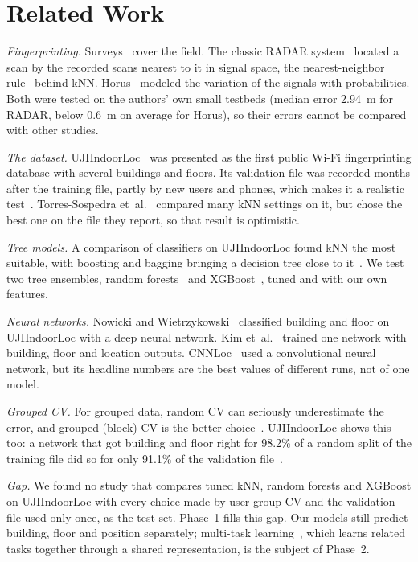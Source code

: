 \section{Related Work}\label{sec:related}

\emph{Fingerprinting.} Surveys~\cite{liu2007survey,he2016wifi} cover the
field. The classic RADAR system~\cite{bahl2000radar} located a scan by the
recorded scans nearest to it in signal space, the nearest-neighbor
rule~\cite{cover1967nearest} behind kNN. Horus~\cite{youssef2005horus} modeled
the variation of the signals with probabilities. Both were tested on the
authors' own small testbeds (median error 2.94~m for RADAR, below 0.6~m on
average for Horus), so their errors cannot be compared with other studies.

\emph{The dataset.} UJIIndoorLoc~\cite{torres2014ujiindoorloc} was presented
as the first public Wi-Fi fingerprinting database with several buildings and
floors. Its validation file was recorded months after the training file,
partly by new users and phones, which makes it a realistic
test~\cite{torres2015comprehensive}. Torres-Sospedra
et~al.~\cite{torres2015comprehensive} compared many kNN settings on it, but
chose the best one on the file they report, so that result is optimistic.

\emph{Tree models.} A comparison of classifiers on UJIIndoorLoc found kNN the
most suitable, with boosting and bagging bringing a decision tree close to
it~\cite{bozkurt2015comparative}. We test two tree ensembles, random
forests~\cite{breiman2001random} and XGBoost~\cite{chen2016xgboost}, tuned and
with our own features.

\emph{Neural networks.} Nowicki and Wietrzykowski~\cite{nowicki2017loweffort}
classified building and floor on UJIIndoorLoc with a deep neural network. Kim
et~al.~\cite{kim2018scalable} trained one network with building, floor and
location outputs. CNNLoc~\cite{song2019cnnloc} used a convolutional neural
network, but its headline numbers are the best values of different runs, not
of one model.

\emph{Grouped CV.} For grouped data, random CV can seriously underestimate the
error, and grouped (block) CV is the better
choice~\cite{roberts2017crossvalidation}. UJIIndoorLoc shows this too: a
network that got building and floor right for 98.2\% of a random split of the
training file did so for only 91.1\% of the validation
file~\cite{nowicki2017loweffort}.

\emph{Gap.} We found no study that compares tuned kNN, random forests and
XGBoost on UJIIndoorLoc with every choice made by user-group CV and the
validation file used only once, as the test set. Phase~1 fills this gap. Our
models still predict building, floor and position separately; multi-task
learning~\cite{caruana1997multitask}, which learns related tasks together
through a shared representation, is the subject of Phase~2.
